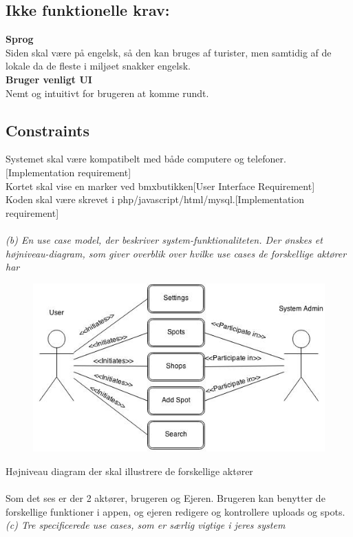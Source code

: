 \documentclass[12pt]{article}
\begin{document}
\subsection*{Ikke funktionelle krav:}
\textbf{Sprog}\\ Siden skal være på engelsk, så den kan bruges af turister, men samtidig af de lokale da de fleste i miljøet snakker engelsk.\\
\textbf{Bruger venligt UI}\\ Nemt og intuitivt for brugeren at komme rundt.\\
\subsection*{Constraints}
Systemet skal være kompatibelt med både computere og telefoner.[Implementation requirement]\\
Kortet skal vise en marker ved bmxbutikken[User Interface Requirement]\\
Koden skal være skrevet i php/javascript/html/mysql.[Implementation requirement]\\
\pagebreak\\

\textit{(b) En use case model, der beskriver system-funktionaliteten. Der ønskes et højniveau-diagram,
som giver overblik over hvilke use cases de forskellige aktører har}\\
\begin{figure}[htb]
\begin{center}
\includegraphics[scale = 0.75]{usecasemodel}
\end{center}
\end{figure}

Højniveau diagram der skal illustrere de forskellige aktører\\\\
Som det ses er der 2 aktører, brugeren og Ejeren. Brugeren kan benytter de forskellige funktioner i appen, og ejeren redigere og kontrollere uploads og spots. 
\pagebreak\\
\textit{(c) Tre specificerede use cases, som er særlig vigtige i jeres system}\\
\setlength\parindent{0pt}
\end{document}
